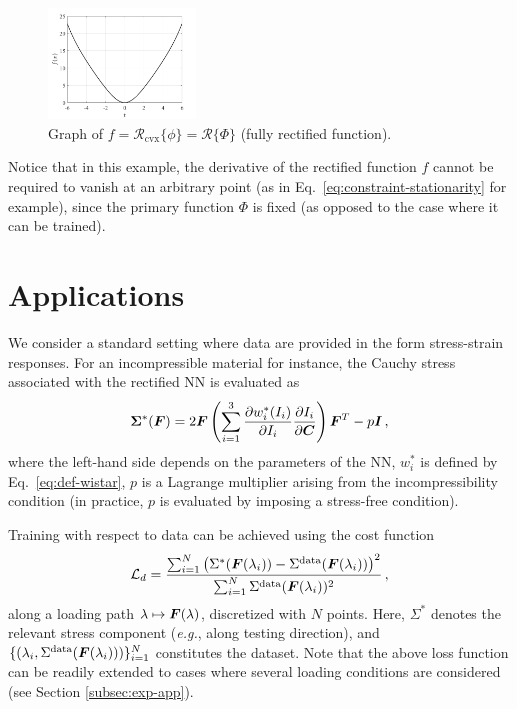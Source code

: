 \begin{remark}
\begin{figure}[ht!]
        \label{fig:sin example 2}
\end{figure}
\begin{figure}[ht!]
    \begin{center}
    \includegraphics[width=0.35\textwidth]{Pictures/rectified_sin.png}
    \end{center}
    \caption[Graph of $f = \mathcal{R}_{\mathrm{cvx}}\{\phi\} = \mathcal{R}\{\Phi\}$.]{Graph of $f = \mathcal{R}_{\mathrm{cvx}}\{\phi\} = \mathcal{R}\{\Phi\}$ (fully rectified function).}
    \label{fig:sin example 3}
\end{figure}
Notice that in this example, the derivative of the rectified function $f$ cannot be required to vanish at an arbitrary point (as in Eq.~\eqref{eq:constraint-stationarity} for example), since the primary function $\Phi$ is fixed (as opposed to the case where it can be trained). 
\end{remark}


\section{Applications}\label{sec:applications}
We consider a standard setting where data are provided in the form stress-strain responses. For an incompressible material for instance, the Cauchy stress associated with the rectified NN is evaluated as
\begin{equation}
    {\bf\Sigma}^*(\boldsymbol{F}) = 2 {\boldsymbol{F}} \left(\sum_{i = 1}^{3} \frac{\partial w_i^*(I_i)}{ \partial I_i} \frac{\partial I_i}{ \partial \boldsymbol{C}} \right) \boldsymbol{F}^T - p\boldsymbol{I}\,,
\end{equation}
where the left-hand side depends on the parameters of the NN, $w_i^*$ is defined by Eq.~\eqref{eq:def-wistar}, $p$ is a Lagrange multiplier arising from the incompressibility condition (in practice, $p$ is evaluated by imposing a stress-free condition). 

Training with respect to data can be achieved using the cost function
\begin{equation}\label{eq:def-Ld}
     \mathcal{L}_d = \frac{\sum_{i = 1}^{N} \left( \Sigma^*(\boldsymbol{F}(\lambda_i)) - \Sigma^{\textnormal{data}}(\boldsymbol{F}(\lambda_i)) \right)^2}{\sum_{i = 1}^{N} \Sigma^{\textnormal{data}}(\boldsymbol{F}(\lambda_i))^2 }\,,
\end{equation}
along a loading path $\lambda \mapsto \boldsymbol{F}(\lambda)$, discretized with $N$ points. Here, $\Sigma^*$ denotes the relevant stress component (\textit{e.g.}, along testing direction), and $\{(\lambda_i, \Sigma^{\textnormal{data}}(\boldsymbol{F}(\lambda_i)))\}_{i = 1}^{N}$ constitutes the dataset. Note that the above loss function can be readily extended to cases where several loading conditions are considered (see Section \ref{subsec:exp-app}).

